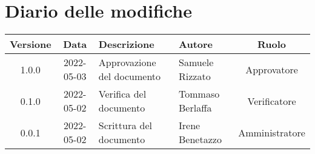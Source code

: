 \section*{Diario delle modifiche}
	\begin{center}
	\renewcommand{\arraystretch}{1.8} %
	\begin{tabular}{ |c|c|m{12em}|m{7em}|c| }
	\hline
	\textbf{Versione} & \textbf{Data} & \textbf{Descrizione} &  \textbf{Autore} &  \textbf{Ruolo} \\ %
	\hline
	1.0.0 & 2022-05-03 & Approvazione del \newline documento & Samuele \newline Rizzato & Approvatore\\
	\hline
	0.1.0 & 2022-05-02 & Verifica del documento & Tommaso Berlaffa & Verificatore\\
	\hline
    0.0.1 & 2022-05-02 & Scrittura del documento & Irene Benetazzo & Amministratore\\ 
	\hline
	\end{tabular}
	\end{center}
	\newpage